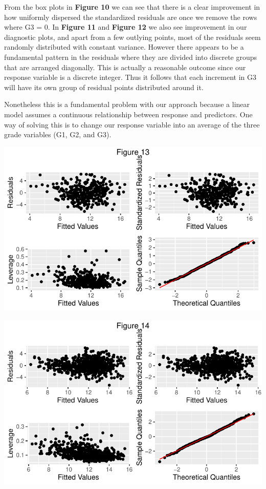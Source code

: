 \documentclass[
  letterpaper,
  DIV=11,
  numbers=noendperiod]{scrartcl}
\begin{document}
From the box plots in \textbf{Figure 10} we can see that there is a
clear improvement in how uniformly dispersed the standardized residuals
are once we remove the rows where G3 = 0. In \textbf{Figure 11} and
\textbf{Figure 12} we also see improvement in our diagnostic plots, and
apart from a few outlying points, most of the residuals seem randomly
distributed with constant variance. However there appears to be a
fundamental pattern in the residuals where they are divided into
discrete groups that are arranged diagonally. This is actually a
reasonable outcome since our response variable is a discrete integer.
Thus it follows that each increment in G3 will have its own group of
residual points distributed around it.

Nonetheless this is a fundamental problem with our approach because a
linear model assumes a continuous relationship between response and
predictors. One way of solving this is to change our response variable
into an average of the three grade variables (G1, G2, and G3).

\includegraphics{Final_Paper_edit_files/figure-pdf/unnamed-chunk-12-1.pdf}

\includegraphics{Final_Paper_edit_files/figure-pdf/unnamed-chunk-12-2.pdf}
\end{document}
